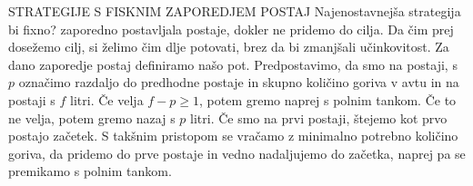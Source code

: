 STRATEGIJE S FISKNIM ZAPOREDJEM POSTAJ 
Najenostavnejša strategija bi fixno? zaporedno postavljala postaje, dokler ne pridemo do cilja. Da čim prej dosežemo cilj, si želimo čim dlje potovati, brez da bi zmanjšali učinkovitost. 
Za dano zaporedje postaj definiramo našo pot. Predpostavimo, da smo na postaji, s $p$ označimo razdaljo do predhodne postaje in skupno količino goriva v avtu in na postaji s $f$ litri.
Če velja $f - p \geq 1$, potem gremo naprej s polnim tankom. Če to ne velja, potem gremo nazaj s $p$ litri. Če smo na prvi postaji, štejemo kot prvo postajo začetek. S takšnim pristopom 
se vračamo z minimalno potrebno količino goriva, da pridemo do prve postaje in vedno nadaljujemo do začetka, naprej pa se premikamo s polnim tankom.   